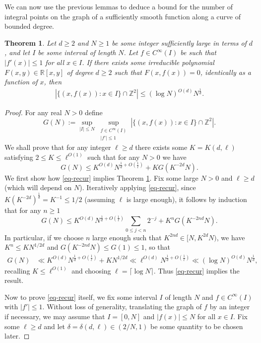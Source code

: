 \documentclass[12pt]{amsart}
\newcommand{\R}{{\mathbb R}}
\newcommand{\Z}{{\mathbb Z}}
\newcommand{\1}{{\mathbf 1}}
\newtheorem{theorem}{Theorem}
\theoremstyle{remark}
\theoremstyle{definition}
\begin{document}
We can now use the previous lemmas to deduce a bound for the number of integral points on the graph of a sufficiently smooth function along a curve of bounded degree.
\begin{theorem}\label{thm:GNbound}
Let $d\geq 2$ and $N\geq 1$ be some integer sufficiently large in terms of $d$, and let $I$ be some interval of length $N$. Let $f\in C^\infty(I)$ be such that $\lvert f'(x)\rvert \leq 1$ for all $x\in I$. If there exists some irreducible polynomial $F(x,y)\in \R[x,y]$ of degree $d\geq 2$ such that $F(x,f(x))= 0$, identically as a function of $x$, then 
\begin{align*}
\left\lvert\big\{ (x,f(x)) : x\in I\big\}\cap \Z^2\right\rvert \le (\log N)^{O(d)}N^{\frac{1}{d}}.
\end{align*}
\end{theorem}
\begin{proof}
For any real $N>0$ define
\[
G(N):= \sup_{|I|\le N} \sup_{\substack{f\in C^\infty(I)\\ \lvert f'\rvert\leq 1}}\left\lvert \big\{(x,f(x)) : x \in I \big\}\cap \Z^2 \right\rvert.\]
We shall prove that for any integer $\ell \geq d$ there exists some $K=K(d,\ell)$ satisfying $2\leq K\leq \ell^{O(1)}$ such that for any $N>0$ we have
\begin{equation}\label{eq-recur}
G(N) \leq K^{O(d)} N^{\frac{1}{d}+O(\frac{1}{\ell})} + KG(K^{-2d}N).
\end{equation}
We first show how \eqref{eq-recur} implies Theorem \ref{thm:GNbound}. Fix some large $N>0$ and $\ell\geq d$ (which will depend on $N$). Iteratively applying \eqref{eq-recur}, since $K(K^{-2d})^{\frac{1}{d}}= K^{-1}\leq  1/2$ (assuming $\ell$ is large enough), it follows by induction that for any $n\geq 1$
\[G(N) \leq K^{O(d)}N^{\frac{1}{d}+O(\frac{1}{\ell})}\sum_{0\leq j<n}2^{-j}+K^nG(K^{-2nd}N).\]
In particular, if we choose $n$ large enough such that $K^{2nd}\in [N,K^{2d}N)$, we have $K^n \leq KN^{1/2d}$ and $G(K^{-2nd}N)\leq G(1)\le 1$, so that
\begin{align*}
G(N) & \ll K^{O(d)}N^{\frac{1}{d}+O(\frac{1}{\ell})}+KN^{1/2d} \ll \ell^{O(d)}N^{\frac{1}{d}+O(\frac{1}{\ell})} \ll(\log N)^{O(d)}N^{\frac{1}{d}},
\end{align*}
recalling $K\leq \ell^{O(1)}$ and choosing $\ell=\lceil \log N\rceil$. Thus \eqref{eq-recur} implies the result.

Now to prove \eqref{eq-recur} itself, we fix some interval $I$ of length $N$ and $f\in C^\infty(I)$ with $\lvert f'\rvert\leq 1$. Without loss of generality, translating the graph of $f$ by an integer if necessary, we may assume that $I=[0,N]$ and $\lvert f(x)\rvert \leq N$ for all $x\in I$. Fix some $\ell\geq d$ and let $\delta=\delta(d,\ell)\in(2/N,1)$ be some quantity to be chosen later. 


\end{proof}
\end{document}
